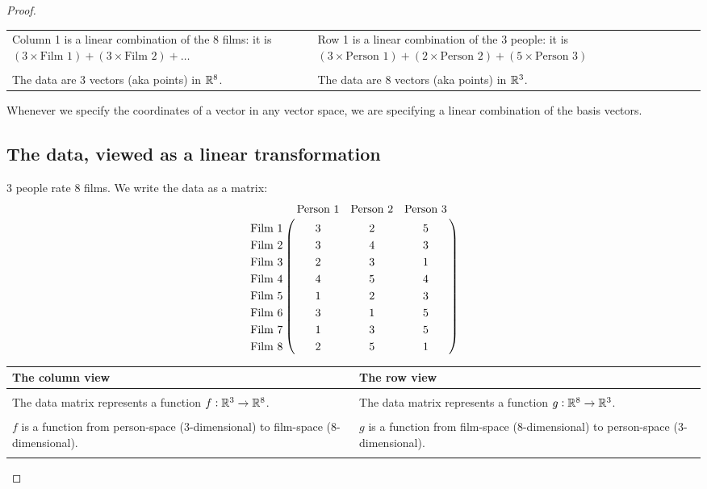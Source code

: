 \begin{proof}
\begin{tabular}{|p{8cm}|p{8 cm}|}
  Column 1 is a linear combination of the 8 films: it is
  $(3 \times \text{Film 1}) + (3 \times \text{Film 2}) + \ldots$
  &Row 1 is a linear combination of the 3 people: it is
    $(3 \times \text{Person 1}) + (2 \times \text{Person 2}) + (5 \times \text{Person 3})$\\
  &\\

  The data are 3 vectors (aka points) in $\mathbb{R}^8$.
  &The data are 8 vectors (aka points) in $\mathbb{R}^3$.
\end{tabular}

Whenever we specify the coordinates of a vector in any vector space, we are specifying a linear
combination of the basis vectors.

\newpage
\subsection*{The data, viewed as a linear transformation}

3 people rate 8 films. We write the data as a matrix:
\begin{align*}
\bordermatrix{
                &\text{Person 1} & \text{Person 2} &\text{Person 3} \cr
  \text{Film 1} &3               &  2              &  5             \cr
  \text{Film 2} &3               &  4              &  3             \cr
  \text{Film 3} &2               &  3              &  1             \cr
  \text{Film 4} &4               &  5              &  4             \cr
  \text{Film 5} &1               &  2              &  3             \cr
  \text{Film 6} &3               &  1              &  5             \cr
  \text{Film 7} &1               &  3              &  5             \cr
  \text{Film 8} &2               &  5              &  1             \cr
}
\end{align*}
\begin{tabular}{|p{8cm}|p{8 cm}|}
  {\bf The column view}
  &{\bf The row view}\\

  \hline
  &\\
  The data matrix represents a function $f: \mathbb{R}^3 \to \mathbb{R}^8$.
  &The data matrix represents a function $g: \mathbb{R}^8 \to \mathbb{R}^3$.\\
  &\\

  $f$ is a function from person-space (3-dimensional) to film-space (8-dimensional).
  &$g$ is a function from film-space (8-dimensional) to person-space (3-dimensional).\\
  &\\


\end{tabular}
\end{proof}
